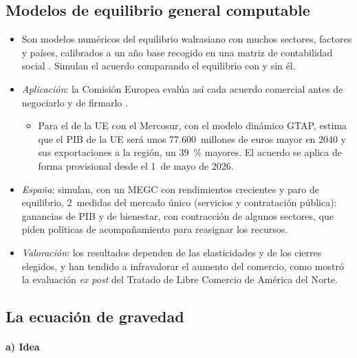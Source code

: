 \documentclass[11pt]{article}
\begin{document}
\subsection{Modelos de equilibrio general computable}\label{sec:megc}

\begin{itemize}
\item Son modelos numéricos del equilibrio walrasiano con muchos sectores, factores y países, calibrados a un año base recogido en una matriz de contabilidad social . Simulan el acuerdo comparando el equilibrio con y sin él.
\item \emph{Aplicación}: la Comisión Europea evalúa así cada acuerdo comercial antes de negociarlo y de firmarlo .
  \begin{itemize}
  \item Para el de la UE con el Mercosur, con el modelo dinámico GTAP, estima que el PIB de la UE será unos 77.600~millones de euros mayor en 2040 y sus exportaciones a la región, un 39~\% mayores\nocite{CE2025MercosurAnalisis}. El acuerdo se aplica de forma provisional desde el 1~de mayo de 2026\nocite{CE2026MercosurProvisional}.
  \end{itemize}
\item \emph{España}: \textcite{BajoRubioGomezPlana2005Simulating} simulan, con un MEGC con rendimientos crecientes y paro de equilibrio, 2~medidas del mercado único (servicios y contratación pública): ganancias de PIB y de bienestar, con contracción de algunos sectores, que piden políticas de acompañamiento para reasignar los recursos.
\item \emph{Valoración}: los resultados dependen de las elasticidades y de los cierres elegidos, y han tendido a infravalorar el aumento del comercio, como mostró la evaluación \emph{ex post} del Tratado de Libre Comercio de América del Norte\nocite{Kehoe2005Evaluation}.
\end{itemize}

\subsection{La ecuación de gravedad}\label{sec:gravedad}

\paragraph{a) Idea}
\end{document}
